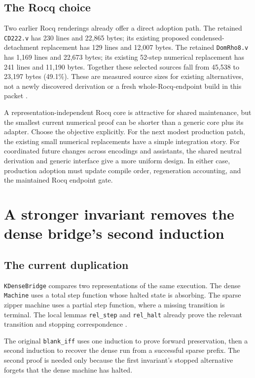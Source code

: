 \documentclass[11pt,letterpaper]{article}
\newcommand{\code}[1]{\texttt{#1}}
\begin{document}
\subsection{The Rocq choice}

Two earlier Rocq renderings already offer a direct adoption path. The retained
\code{CD222.v} has 230 lines and 22,865 bytes; its existing proposed condensed-detachment
replacement has 129 lines and 12,007 bytes. The retained \code{DomRho8.v} has 1,169
lines and 22,673 bytes; its existing 52-step numerical replacement has 241 lines and
11,190 bytes. Together these selected sources fall from 45,538 to 23,197 bytes
(49.1\%). These are measured source sizes for existing alternatives, not a newly
discovered derivation or a fresh whole-Rocq-endpoint build in this packet
\cite{rocqproposal}.

A representation-independent Rocq core is attractive for shared maintenance, but the
smallest current numerical proof can be shorter than a generic core plus its adapter.
Choose the objective explicitly. For the next modest production patch, the existing
small numerical replacements have a simple integration story. For coordinated future
changes across encodings and assistants, the shared neutral derivation and generic
interface give a more uniform design. In either case, production adoption must update
compile order, regeneration accounting, and the maintained Rocq endpoint gate.

\section{A stronger invariant removes the dense bridge's second induction}

\subsection{The current duplication}

\code{KDenseBridge} compares two representations of the same execution. The dense
\code{Machine} uses a total step function whose halted state is absorbing. The sparse
zipper machine uses a partial step function, where a missing transition is terminal.
The local lemmas \code{rel\_step} and \code{rel\_halt} already prove the relevant
transition and stopping correspondence \cite{densebridge}.

The original \code{blank\_iff} uses one induction to prove forward preservation,
then a second induction to recover the dense run from a successful sparse prefix.
The second proof is needed only because the first invariant's stopped alternative
forgets that the dense machine has halted.
\end{document}

